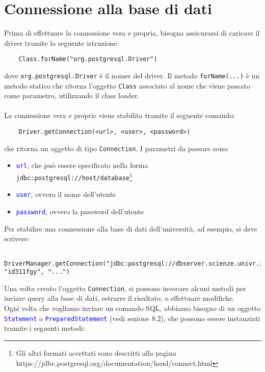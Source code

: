 \documentclass[12pt,a4paper]{book}
\begin{document}
	\section{Connessione alla base di dati}
	Prima di effettuare la connessione vera e propria, bisogna assicurarsi di caricare il driver tramite la seguente istruzione:
	\begin{lstlisting}
	Class.forName("org.postgresql.Driver")
	\end{lstlisting}
	dove \texttt{org.postgresql.Driver} è il nomer del driver. Il metodo \texttt{forName(...)} è un metodo statico che ritorna l'oggetto \texttt{Class} associato al nome che viene passato come parametro, utilizzando il class loader.
	\paragraph{}La connessione vera e proprie viene stabilita tramite il seguente comando:
	\begin{lstlisting}
	Driver.getConnection(<url>, <user>, <password>)
	\end{lstlisting}
	che ritorna un oggetto di tipo \texttt{Connection}. I parametri da passare sono:
	\begin{itemize}
		\item \textcolor{blue}{\texttt{url}}, che può essere specificato nella forma \texttt{jdbc:postgresql://host/database}\footnote{Gli altri formati accettati sono descritti alla pagina https://jdbc.postgresql.org/documentation/head/connect.html }
		\item \textcolor{blue}{\texttt{user}}, ovvero il nome dell'utente
		\item \textcolor{blue}{\texttt{password}}, ovvero la password dell'utente
	\end{itemize}
	Per stabilire una connessione alla base di dati dell'università, ad esempio, si deve scrivere:
	\begin{lstlisting}
	DriverManager.getConnection("jdbc:postgresql://dbserver.scienze.univr.it/id311fgy", "id311fgy", "...")
	\end{lstlisting}
	Una volta creato l'oggetto \texttt{Connection}, si possono invocare alcuni metodi per inviare query alla base di dati, estrarre il risultato, o effettuare modifiche.\\
	Ogni volta che vogliamo inviare un comando SQL, abbiamo bisogno di un oggetto \textcolor{blue}{\texttt{Statement}} o \textcolor{blue}{\texttt{PreparedStatement}} (vedi sezione 8.2), che possono essere instanziati tramite i seguenti metodi:
\end{document}
